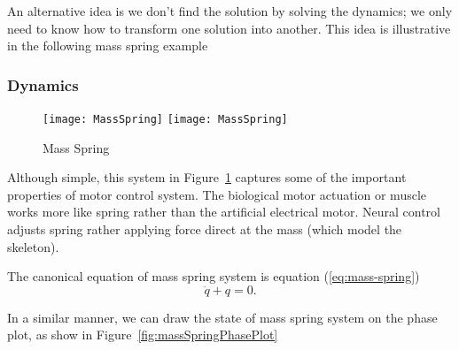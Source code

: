 An alternative idea is we don’t find the solution by solving the dynamics; we only need to know how to transform one solution into another.
This idea is illustrative in the following mass spring example

\subsubsection*{Dynamics}

\begin{figure}[!htbp]
  \begin{center}
    \leavevmode
    \ifpdf
      \texttt{[image: MassSpring]}
    \else
      \texttt{[image: MassSpring]}
    \fi
    \caption{Mass Spring}
    \label{fig:massspring}
  \end{center}
\end{figure}
Although simple, this system in Figure~\ref{fig:massspring} captures some of the important properties of motor control system.
The biological motor actuation or muscle works more like spring rather than the artificial electrical motor. 
Neural control adjusts spring rather applying force direct at the mass (which model the skeleton).


The canonical equation of mass spring system is equation (\ref{eq:mass-spring})
\begin{equation}
\label{eq:mass-spring}
\ddot{q}+q=0.
\end{equation}

In a similar manner, we can draw the state of mass spring system on the phase plot, as show in Figure~\ref{fig:massSpringPhasePlot}


